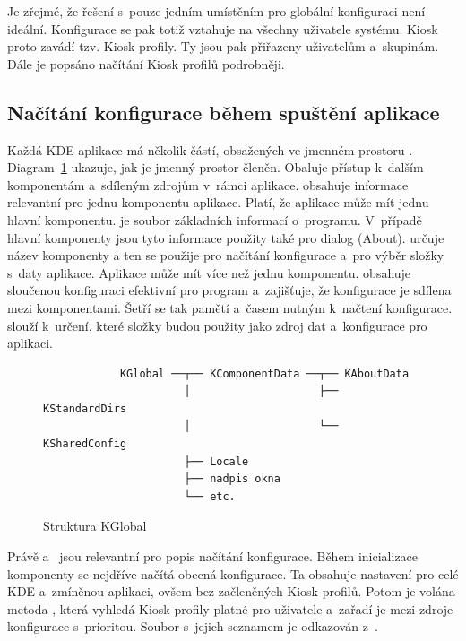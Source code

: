 Je zřejmé, že řešení s~pouze jedním umístěním pro globální konfiguraci není ideální. Konfigurace se pak totiž vztahuje na všechny uživatele systému. Kiosk proto zavádí tzv. Kiosk profily. Ty jsou pak přiřazeny uživatelům a~skupinám. Dále je popsáno načítání Kiosk profilů podrobněji.

\subsection*{Načítání konfigurace během spuštění aplikace}
Každá KDE aplikace má několik částí, obsažených ve jmenném prostoru . Diagram~\ref{fig:kglobal} ukazuje, jak je jmenný prostor  členěn. Obaluje přístup k~dalším komponentám a~sdíleným zdrojům v~rámci aplikace.  obsahuje informace relevantní pro jednu komponentu aplikace. Platí, že aplikace může mít jednu hlavní komponentu.  je soubor základních informací o~programu. V~případě hlavní komponenty jsou tyto informace použity také pro dialog  (About).  určuje název komponenty a ten se použije pro načítání konfigurace a~pro výběr složky s~daty aplikace. Aplikace může mít více než jednu komponentu.  obsahuje sloučenou konfiguraci efektivní pro program a~zajišťuje, že konfigurace je sdílena mezi komponentami. Šetří se tak pamětí a~časem nutným k~načtení konfigurace.  slouží k~určení, které složky budou použity jako zdroj dat a~konfigurace pro aplikaci.

\begin{figure}[h]
    \centering
    \begin{verbatim}
            KGlobal ──┬── KComponentData ──┬── KAboutData
                      │                    ├── KStandardDirs
                      │                    └── KSharedConfig
                      ├── Locale
                      ├── nadpis okna
                      └── etc.\end{verbatim}
    \caption{Struktura KGlobal}
    \label{fig:kglobal}
\end{figure}

Právě  a~ jsou relevantní pro popis načítání konfigurace. Během inicializace komponenty se nejdříve načítá obecná konfigurace. Ta obsahuje nastavení pro celé KDE a~zmíněnou aplikaci, ovšem bez začleněných Kiosk profilů. Potom je volána metoda , která vyhledá Kiosk profily platné pro uživatele a~zařadí je mezi zdroje konfigurace s~prioritou. Soubor s~jejich seznamem je odkazován z~.

